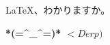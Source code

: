 \documentclass[a4paper]{CVzy}
\begin{document}
\begin{CJK}{UTF8}{min}
\LaTeX 、わかりますか。
 \end{CJK}  

\textbf{*(=\textasciicircum\_\textasciicircum=)* $< Derp)$}
\end{document}
